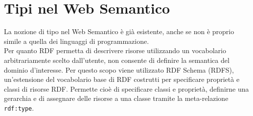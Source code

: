 \section{Tipi nel Web Semantico}
La nozione di tipo nel Web Semantico è già esistente, anche se non è proprio simile a quella dei linguaggi di programmazione.\\
Per quanto RDF permetta di descrivere risorse utilizzando un vocabolario arbitrariamente scelto dall'utente, non consente di definire la semantica del dominio d'interesse. Per questo scopo viene utilizzato RDF Schema (RDFS), un'estensione del vocabolario base di RDF costrutti per specificare proprietà e classi di risorse RDF. Permette cioè di specificare classi e proprietà, definirne una gerarchia e di assegnare delle risorse a una classe tramite la meta-relazione \verb|rdf:type|.